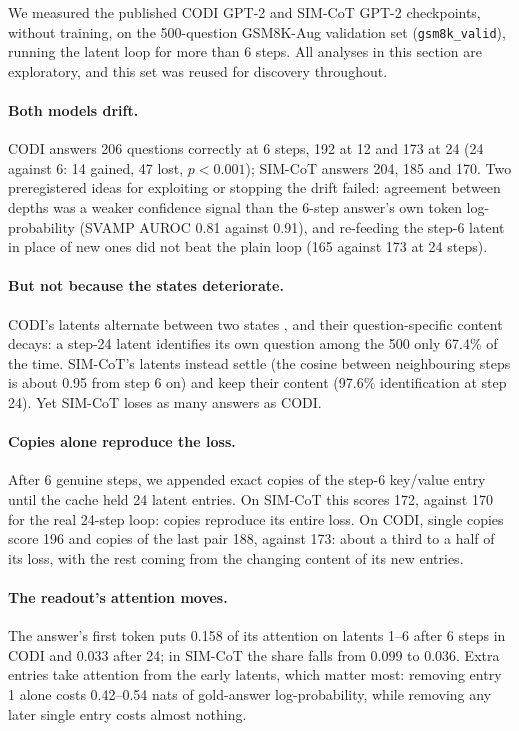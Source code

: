 \documentclass[11pt]{article}
\begin{document}
We measured the published CODI GPT-2 and SIM-CoT GPT-2 checkpoints, without training, on the 500-question GSM8K-Aug
validation set (\texttt{gsm8k\_valid}), running the latent loop for more than 6 steps. All analyses in this section are
exploratory, and this set was reused for discovery throughout.

\paragraph{Both models drift.} CODI answers 206 questions correctly at 6 steps, 192 at 12 and 173 at 24 (24 against 6: 14
gained, 47 lost, $p < 0.001$); SIM-CoT answers 204, 185 and 170. Two preregistered ideas for exploiting or stopping the drift
failed: agreement between depths was a weaker confidence signal than the 6-step answer's own token log-probability (SVAMP
AUROC 0.81 against 0.91), and re-feeding the step-6 latent in place of new ones did not beat the plain loop (165 against 173
at 24 steps).

\paragraph{But not because the states deteriorate.} CODI's latents alternate between two states \citep[as in][]{li2026pmps},
and their question-specific content decays: a step-24 latent identifies its own question among the 500 only 67.4\% of the
time. SIM-CoT's latents instead settle (the cosine between neighbouring steps is about 0.95 from step 6 on) and keep their
content (97.6\% identification at step 24). Yet SIM-CoT loses as many answers as CODI.

\paragraph{Copies alone reproduce the loss.} After 6 genuine steps, we appended exact copies of the step-6 key/value entry
until the cache held 24 latent entries. On SIM-CoT this scores 172, against 170 for the real 24-step loop: copies reproduce
its entire loss. On CODI, single copies score 196 and copies of the last pair 188, against 173: about a third to a half of
its loss, with the rest coming from the changing content of its new entries.

\paragraph{The readout's attention moves.} The answer's first token puts 0.158 of its attention on latents 1--6 after 6 steps
in CODI and 0.033 after 24; in SIM-CoT the share falls from 0.099 to 0.036. Extra entries take attention from the early
latents, which matter most: removing entry 1 alone costs 0.42--0.54 nats of gold-answer log-probability, while removing any
later single entry costs almost nothing.
\end{document}
